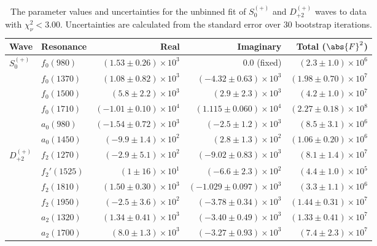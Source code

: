\begin{table}[ht]
    \begin{center}
        \begin{tabular}{llrrr}\toprule
        Wave & Resonance & Real & Imaginary & Total ($\abs{F}^2$) \\\midrule
$S_{0}^{(+)}$ & $f_{0}(980)$ & $(1.53 \pm 0.26) \times 10^{3}$ & $0.0$ (fixed) & $(2.3 \pm 1.0) \times 10^{6}$ \\
 & $f_{0}(1370)$ & $(1.08 \pm 0.82) \times 10^{3}$ & $(-4.32 \pm 0.63) \times 10^{3}$ & $(1.98 \pm 0.70) \times 10^{7}$ \\
 & $f_{0}(1500)$ & $(5.8 \pm 2.2) \times 10^{3}$ & $(2.9 \pm 2.3) \times 10^{3}$ & $(4.2 \pm 1.0) \times 10^{7}$ \\
 & $f_{0}(1710)$ & $(-1.01 \pm 0.10) \times 10^{4}$ & $(1.115 \pm 0.060) \times 10^{4}$ & $(2.27 \pm 0.18) \times 10^{8}$ \\
 & $a_{0}(980)$ & $(-1.54 \pm 0.72) \times 10^{3}$ & $(-2.5 \pm 1.2) \times 10^{3}$ & $(8.5 \pm 3.1) \times 10^{6}$ \\
 & $a_{0}(1450)$ & $(-9.9 \pm 1.4) \times 10^{2}$ & $(2.8 \pm 1.3) \times 10^{2}$ & $(1.06 \pm 0.20) \times 10^{6}$ \\
$D_{+2}^{(+)}$ & $f_{2}(1270)$ & $(-2.9 \pm 5.1) \times 10^{2}$ & $(-9.02 \pm 0.83) \times 10^{3}$ & $(8.1 \pm 1.4) \times 10^{7}$ \\
 & $f_{2}'(1525)$ & $(1 \pm 16) \times 10^{1}$ & $(-6.6 \pm 2.3) \times 10^{2}$ & $(4.4 \pm 1.0) \times 10^{5}$ \\
 & $f_{2}(1810)$ & $(1.50 \pm 0.30) \times 10^{3}$ & $(-1.029 \pm 0.097) \times 10^{3}$ & $(3.3 \pm 1.1) \times 10^{6}$ \\
 & $f_{2}(1950)$ & $(-2.5 \pm 3.6) \times 10^{2}$ & $(-3.78 \pm 0.34) \times 10^{3}$ & $(1.44 \pm 0.31) \times 10^{7}$ \\
 & $a_{2}(1320)$ & $(1.34 \pm 0.41) \times 10^{3}$ & $(-3.40 \pm 0.49) \times 10^{3}$ & $(1.33 \pm 0.41) \times 10^{7}$ \\
 & $a_{2}(1700)$ & $(8.0 \pm 1.3) \times 10^{3}$ & $(-3.27 \pm 0.93) \times 10^{3}$ & $(7.4 \pm 2.3) \times 10^{7}$ \\\bottomrule
        \end{tabular}
    \caption{The parameter values and uncertainties for the unbinned fit of $S_{0}^{(+)}$ and $D_{+2}^{(+)}$ waves to data with $\chi^2_\nu < 3.00$. Uncertainties are calculated from the standard error over $30$ bootstrap iterations.}\label{tab:unbinned-fit-chisqdof-3.0-Sp0p-Dp2p}
    \end{center}
\end{table}
